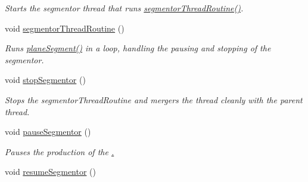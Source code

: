 \begin{DoxyCompactItemize}
\begin{DoxyCompactList}\small\item\em Starts the segmentor thread that runs \hyperlink{classpersonal_robotics_1_1_object_segmentor_a54dffdc44e4b61ee329c7524f5c04ed1}{segmentor\+Thread\+Routine()}. \end{DoxyCompactList}\item 
\hypertarget{classpersonal_robotics_1_1_object_segmentor_a54dffdc44e4b61ee329c7524f5c04ed1}{}void \hyperlink{classpersonal_robotics_1_1_object_segmentor_a54dffdc44e4b61ee329c7524f5c04ed1}{segmentor\+Thread\+Routine} ()\label{classpersonal_robotics_1_1_object_segmentor_a54dffdc44e4b61ee329c7524f5c04ed1}

\begin{DoxyCompactList}\small\item\em Runs \hyperlink{classpersonal_robotics_1_1_object_segmentor_ad2e4795303539fb1cdd9408730e446cc}{plane\+Segment()} in a loop, handling the pausing and stopping of the segmentor. \end{DoxyCompactList}\item 
\hypertarget{classpersonal_robotics_1_1_object_segmentor_a7704862f53318f456f3efd58d007ea3b}{}void \hyperlink{classpersonal_robotics_1_1_object_segmentor_a7704862f53318f456f3efd58d007ea3b}{stop\+Segmentor} ()\label{classpersonal_robotics_1_1_object_segmentor_a7704862f53318f456f3efd58d007ea3b}

\begin{DoxyCompactList}\small\item\em Stops the segmentor\+Thread\+Routine and mergers the thread cleanly with the parent thread. \end{DoxyCompactList}\item 
\hypertarget{classpersonal_robotics_1_1_object_segmentor_a1e86b4a949c644ab5d9d0079f3e57cad}{}void \hyperlink{classpersonal_robotics_1_1_object_segmentor_a1e86b4a949c644ab5d9d0079f3e57cad}{pause\+Segmentor} ()\label{classpersonal_robotics_1_1_object_segmentor_a1e86b4a949c644ab5d9d0079f3e57cad}

\begin{DoxyCompactList}\small\item\em Pauses the production of the \hyperlink{classpersonal_robotics_1_1_object_segmentor_aab2136d73a02806e2b09611ed67e65d9}{. }\end{DoxyCompactList}\item 
\hypertarget{classpersonal_robotics_1_1_object_segmentor_ab65274e8f1119d39c80e4e0727432336}{}void \hyperlink{classpersonal_robotics_1_1_object_segmentor_ab65274e8f1119d39c80e4e0727432336}{resume\+Segmentor} ()\label{classpersonal_robotics_1_1_object_segmentor_ab65274e8f1119d39c80e4e0727432336}


\end{DoxyCompactItemize}
